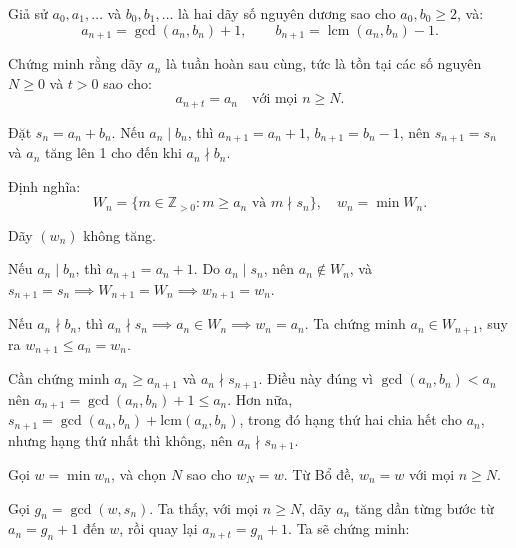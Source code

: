 \ifshowproblemandsoln
\ifshowproblem\begin{problem}\label{problem:IMO-2015-SL-P4}\fi
\ifshowsoln\begin{problem}\fi
    Giả sử \( a_0, a_1, \ldots \) và \( b_0, b_1, \ldots \) là hai dãy số nguyên dương sao cho \( a_0, b_0 \ge 2 \), và:
    \[
        a_{n+1} = \gcd(a_n, b_n) + 1, \qquad b_{n+1} = \operatorname{lcm}(a_n, b_n) - 1.
    \]

    Chứng minh rằng dãy \( a_n \) là tuần hoàn sau cùng, tức là tồn tại các số nguyên \( N \ge 0 \) và \( t > 0 \) sao cho:
    \[
        a_{n+t} = a_n \quad \text{với mọi } n \ge N.
    \]
\end{problem}
\fi

\ifshowsoln
\begin{soln}\footnotemark
    Đặt \( s_n = a_n + b_n \). Nếu \( a_n \mid b_n \), thì \( a_{n+1} = a_n + 1 \), \( b_{n+1} = b_n - 1 \),
    nên \( s_{n+1} = s_n \) và \( a_n \) tăng lên 1 cho đến khi \( a_n \nmid b_n \).

    Định nghĩa:
    \[
        W_n = \{ m \in \mathbb{Z}_{>0} : m \ge a_n \text{ và } m \nmid s_n \}, \quad w_n = \min W_n.
    \]

    \begin{claim*}
        Dãy \( (w_n) \) không tăng.
    \end{claim*}

    \begin{subproof}
        Nếu \( a_n \mid b_n \), thì \( a_{n+1} = a_n + 1 \). Do \( a_n \mid s_n \), nên \( a_n \notin W_n \), và \( s_{n+1} = s_n \implies W_{n+1} = W_n \implies w_{n+1} = w_n \).

        Nếu \( a_n \nmid b_n \), thì \( a_n \nmid s_n \implies a_n \in W_n \implies w_n = a_n \). Ta chứng minh \( a_n \in W_{n+1} \), suy ra \( w_{n+1} \le a_n = w_n \).

        Cần chứng minh \( a_n \ge a_{n+1} \) và \( a_n \nmid s_{n+1} \). Điều này đúng vì \( \gcd(a_n, b_n) < a_n \) nên \( a_{n+1} = \gcd(a_n, b_n) + 1 \le a_n \). Hơn nữa, \( s_{n+1} = \gcd(a_n, b_n) + \text{lcm}(a_n, b_n) \), trong đó hạng thứ hai chia hết cho \( a_n \), nhưng hạng thứ nhất thì không, nên \( a_n \nmid s_{n+1} \).
    \end{subproof}

    Gọi \( w = \min w_n \), và chọn \( N \) sao cho \( w_N = w \). Từ Bổ đề, \( w_n = w \) với mọi \( n \ge N \).

    Gọi \( g_n = \gcd(w, s_n) \). Ta thấy, với mọi \( n \ge N \), dãy \( a_n \) tăng dần từng bước từ \( a_n = g_n + 1 \) đến \( w \), rồi quay lại \( a_{n+t} = g_n + 1 \). Ta sẽ chứng minh:


\end{soln}
\end{problem}
